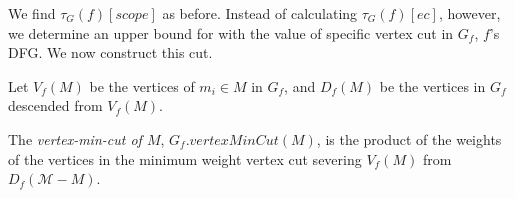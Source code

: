 We find $\tau_G(f)[scope]$ as before. Instead of calculating $\tau_G(f)[ec]$, however, we determine an upper bound for with the value of specific vertex cut in $G_f$, $f$'s DFG. We now construct this cut.






\begin{definition} Let $V_f(M)$ be the vertices of $m_i \in M$ in $G_f$, and $D_f(M)$ be the vertices in $G_f$ descended from $V_f(M)$. 
\vspace{2mm}

The {\em vertex-min-cut of $M$}, $G_f.vertexMinCut(M)$, is the product of the weights of the vertices in the minimum weight vertex cut severing $V_f(M)$ from $D_f(\mathcal{M} -M)$.
\end{definition}



